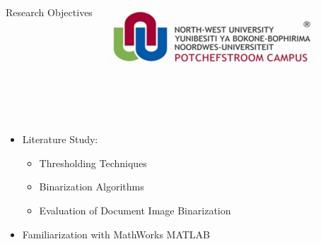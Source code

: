\documentclass[11pt]{beamer}
\begin{document}
	\begin{frame}[t]
		\begin{columns}[onlytextwidth]
				\begin{Large}
					\vspace{-0.2cm}
					\color{beamer@maroon}Research Objectives
				\end{Large}
				\includegraphics[scale=0.4]{nwulogo.jpeg}
		\end{columns}
		\hspace{0.1cm}
		\newline
		\noindent\makebox[\linewidth]{\rule{\paperwidth}{0.4pt}}\\
		[1cm]
		\begin{columns}[onlytextwidth]
				\begin{itemize}
					\item Literature Study:
					\begin{itemize}
						\item Thresholding Techniques
						\item Binarization Algorithms
						\item Evaluation of Document Image Binarization
					\end{itemize}
					\item<2-> Familiarization with MathWorks MATLAB
				\end{itemize}
				\vspace{-0.7cm}

\end{columns}
\end{frame}
\end{document}
